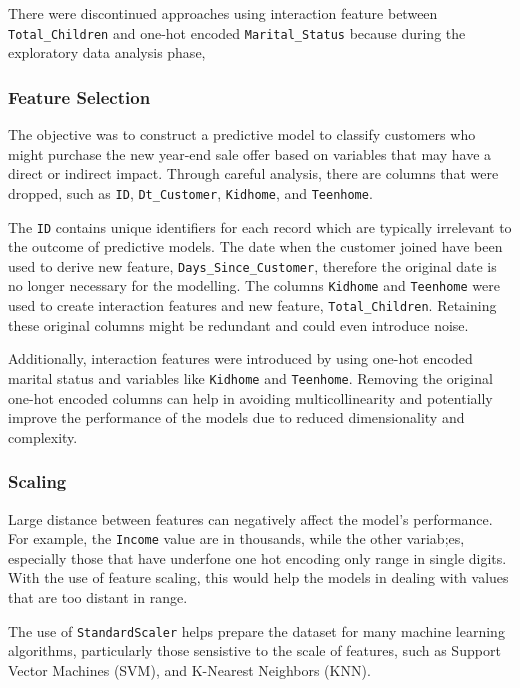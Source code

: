 There were discontinued approaches using interaction feature between \texttt{Total_Children} and one-hot encoded \texttt{Marital_Status} because during the exploratory data analysis phase, 

\subsubsection{Feature Selection}

The objective was to construct a predictive model to classify customers who might purchase the new year-end sale offer based on variables that may have a direct or indirect impact. Through careful analysis, there are columns that were dropped, such as \texttt{ID}, \texttt{Dt\_Customer}, \texttt{Kidhome}, and \texttt{Teenhome}. 

The \texttt{ID} contains unique identifiers for each record which are typically irrelevant to the outcome of predictive models. The date when the customer joined have been used to derive new feature, \texttt{Days\_Since\_Customer}, therefore the original date is no longer necessary for the modelling. The columns \texttt{Kidhome} and \texttt{Teenhome} were used to create interaction features and new feature, \texttt{Total\_Children}. Retaining these original columns might be redundant and could even introduce noise.

Additionally, interaction features were introduced by  using one-hot encoded marital status and variables like \texttt{Kidhome} and \texttt{Teenhome}. Removing the original one-hot encoded columns can help in avoiding multicollinearity and potentially improve the performance of the models due to reduced dimensionality and complexity.

\subsubsection{Scaling}

Large distance between features can negatively affect the model's performance. For example, the \texttt{Income} value are in thousands, while the other variab;es, especially those that have underfone one hot encoding only range in single digits. With the use of feature scaling, this would help the models in dealing with values that are too distant in range.

The use of \texttt{StandardScaler} helps prepare the dataset for many machine learning algorithms, particularly those sensistive to the scale of features, such as Support Vector Machines (SVM), and K-Nearest Neighbors (KNN). 

